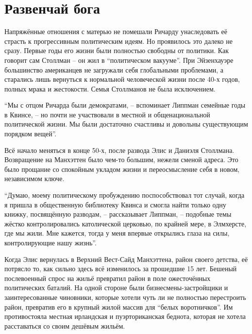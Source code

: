 
\chapter{Развенчай бога}

Напряжённые отношения с матерью не помешали Ричарду унаследовать её страсть к прогрессивным политическим идеям. Но проявилось это далеко не сразу. Первые годы его жизни были полностью свободны от политики. Как говорит сам Столлман -- он жил в \enquote{политическом вакууме}. При Эйзенхауэре большинство американцев не загружали себя глобальными проблемами, а старались лишь вернуться к нормальной человеческой жизни после 40-х годов, полных мрака и жестокости. Семья Столлманов не была исключением.

\enquote{Мы с отцом Ричарда были демократами, -- вспоминает Липпман семейные годы в Квинсе, -- но почти не участвовали в местной и общенациональной политической жизни. Мы были достаточно счастливы и довольны существующим порядком вещей}.

Всё начало меняться в конце 50-х, после развода Элис и Даниэля Столлмана. Возвращение на Манхэттен было чем-то большим, нежели сменой адреса. Это было прощание со спокойным укладом жизни и переосмысление себя в новом, независимом ключе.

\enquote{Думаю, моему политическому пробуждению поспособствовал тот случай, когда я пришла в общественную библиотеку Квинса и смогла найти только одну книжку, посвящённую разводам, -- рассказывает Липпман, -- подобные темы жёстко контролировались католической церковью, по крайней мере, в Элмхерсте, где мы жили. Мне кажется, тогда у меня впервые открылись глаза на силы, контролирующие нашу жизнь}.

Когда Элис вернулась в Верхний Вест-Сайд Манхэттена, район своего детства, её потрясло то, как сильно здесь всё изменилось за прошедшие 15 лет. Бешеный послевоенный спрос на жильё превратил район в поле ожесточённых политических баталий. На одной стороне были бизнесмены-застройщики и заинтересованные чиновники, которые хотели чуть ли не полностью перестроить район, превратив его в крупный жилой массив для \enquote{белых воротничков}. Им противостояла местная ирландская и пуэрториканская беднота, которая не хотела расставаться со своим дешёвым жильём.

